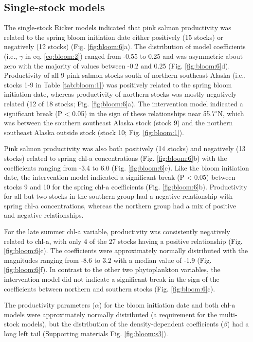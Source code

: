 \subsection{Single-stock models}

The single-stock Ricker models indicated that pink salmon productivity was
related to the spring bloom initiation date either positively (15 stocks) or
negatively (12 stocks) (Fig. \ref{fig:bloom:6}a). The distribution of model
coefficients (i.e., \(\gamma\) in eq. \ref{eq:bloom:2}) ranged from -0.55 to
0.25 and was asymmetric about zero with the majority of values between -0.2 and
0.25 (Fig.  \ref{fig:bloom:6}d).  Productivity of all 9 pink salmon stocks south
of northern southeast Alaska (i.e., stocks 1-9 in Table \ref{tab:bloom:1}) was
positively related to the spring bloom initiation date, whereas productivity of
northern stocks was mostly negatively related (12 of 18 stocks; Fig.
\ref{fig:bloom:6}a). The intervention model indicated a significant break (P
\textless{} 0.05) in the sign of these relationships near 55.7$^{\circ}$N, which
was between the southern southeast Alaska stock (stock 9) and the northern
southeast Alaska outside stock (stock 10; Fig.  \ref{fig:bloom:1}).

Pink salmon productivity was also both positively (14 stocks) and negatively (13
stocks) related to spring chl-a concentrations (Fig. \ref{fig:bloom:6}b) with
the coefficients ranging from -3.4 to 6.0 (Fig. \ref{fig:bloom:6}e). Like the
bloom initiation date, the intervention model indicated a significant break (P
\textless{} 0.05) between stocks 9 and 10 for the spring chl-a coefficients
(Fig. \ref{fig:bloom:6}b). Productivity for all but two stocks in the southern
group had a negative relationship with spring chl-a concentrations, whereas the
northern group had a mix of positive and negative relationships.

For the late summer chl-a variable, productivity was consistently negatively
related to chl-a, with only 4 of the 27 stocks having a positive relationship
(Fig. \ref{fig:bloom:6}c). The coefficients were approximately normally
distributed with the magnitudes ranging from -8.6 to 3.2 with a median value of
-1.9 (Fig.  \ref{fig:bloom:6}f). In contrast to the other two phytoplankton
variables, the intervention model did not indicate a significant break in the
sign of the coefficients between northern and southern stocks (Fig.
\ref{fig:bloom:6}c).

The productivity parameters (\(\alpha\)) for the bloom initiation date and both
chl-a models were approximately normally distributed (a requirement for the
multi-stock models), but the distribution of the density-dependent coefficients
(\(\beta\)) had a long left tail (Supporting materials Fig. \ref{fig:bloom:s3}).


